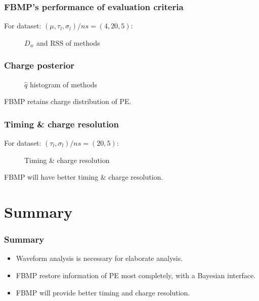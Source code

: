 \documentclass{beamer}
\begin{document}
\begin{CJK*}{UTF8}{gbsn}
\begin{frame}
\frametitle{FBMP's performance of evaluation criteria}
For dataset: $(\mu, \tau_l, \sigma_l)/\si{ns}=(4, 20, 5)$: 
\begin{figure}
    \centering
    \resizebox{\textwidth}{!}{}
    \caption{$D_w$ and $\mathrm{RSS}$ of methods}
\end{figure}
\end{frame}

\begin{frame}
\frametitle{Charge posterior}
\begin{figure}
    \centering
    \resizebox{0.7\textwidth}{!}{}
    \caption{$\hat{q}$ histogram of methods}
\end{figure}
\begin{block}{}
FBMP retains charge distribution of PE. 
\end{block}
\end{frame}

\begin{frame}
\frametitle{Timing \& charge resolution}
For dataset: $(\tau_l, \sigma_l)/\si{ns}=(20, 5)$:
\begin{figure}
    \centering
    \resizebox{\textwidth}{!}{}
    \caption{Timing \& charge resolution}
\end{figure}
\begin{block}{}
FBMP will have better timing \& charge resolution. 
\end{block}
\end{frame}

\section{Summary}

\begin{frame}
\frametitle{Summary}
\begin{itemize}
    \item Waveform analysis is necessary for elaborate analysis. 
    \item FBMP restore information of PE most completely, with a Bayesian interface. 
    \item FBMP will provide better timing and charge resolution. 
\end{itemize}
\end{frame}

\begin{frame}


\end{frame}
\end{CJK*}
\end{document}
